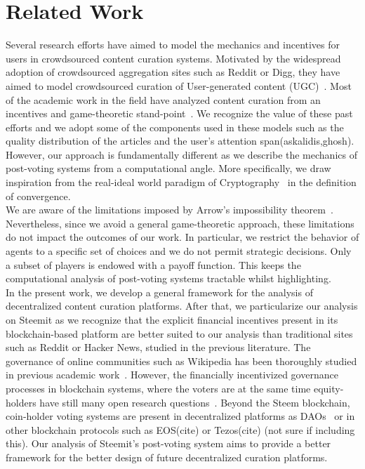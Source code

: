 \section{Related Work}
  Several research efforts have aimed to model the mechanics and incentives for users in crowdsourced content curation systems. Motivated by the widespread adoption of crowdsourced aggregation sites such as Reddit or Digg, they have aimed to model crowdsourced curation of User-generated content (UGC)~\cite{askalidis2013theoretical}. Most of the academic work in the field have analyzed content curation from an incentives and game-theoretic stand-point~\cite{ghosh2011incentivizing,das2010ranking,gupte2009news}. We recognize the value of these past efforts and we adopt some of the components used in these models such as the quality distribution of the articles and the user's attention span(askalidis,ghosh). However, our approach is fundamentally different as we describe the mechanics of post-voting systems from a computational angle. More specifically, we draw inspiration from the real-ideal world paradigm of Cryptography~\cite{lindell} in the definition of convergence.\\
  
  We are aware of the limitations imposed by Arrow's impossibility theorem~\cite{arrow1950difficulty}. Nevertheless, since we avoid a general game-theoretic approach, these limitations do not impact the outcomes of our work. In particular, we restrict the behavior of agents to a specific set of choices and we do not permit strategic decisions. Only a subset of players is endowed with a payoff function. This keeps the computational analysis of post-voting systems tractable whilst highlighting.\\

  
  In the present work, we develop a general framework for the analysis of decentralized content curation platforms. After that, we particularize our analysis on Steemit as we recognize that the explicit financial incentives present in its blockchain-based platform are better suited to our analysis than traditional sites such as Reddit or Hacker News, studied in the previous literature. The governance of online communities such as Wikipedia has been thoroughly studied in previous academic work~\cite{leskovec2010governance,forte2008scaling}. However, the financially incentivized governance processes in blockchain systems, where the voters are at the same time equity-holders have still many open research questions~\cite{vitalik, ehrsam}. Beyond the Steem blockchain, coin-holder voting systems are present in decentralized platforms as DAOs~\cite{darkdaos} or in other blockchain protocols such as EOS(cite) or Tezos(cite) (not sure if including this). Our analysis of Steemit's post-voting system aims to provide a better framework for the better design of future decentralized curation platforms.
  
  
